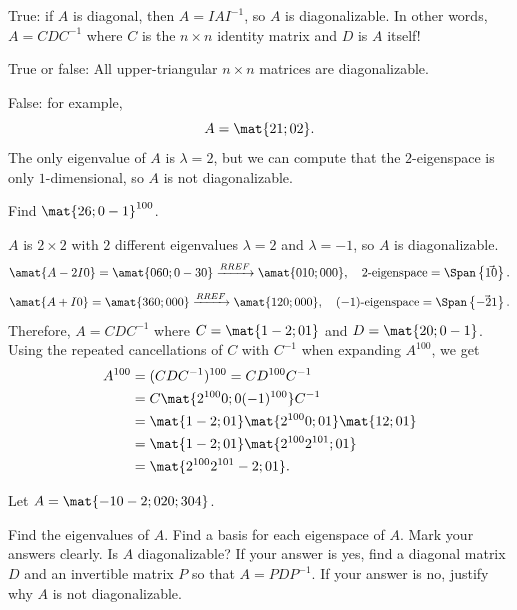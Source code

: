 \begin{problems}
\begin{solution}
  True: if $A$ is diagonal, then $A = I A I^{-1}$, so $A$ is diagonalizable.  In
  other words, $A = CDC^{-1}$ where $C$ is the $n \times n$ identity matrix and
  $D$ is $A$ itself!
\end{solution}

\problem %
True or false: All upper-triangular $n \times n$ matrices are diagonalizable.

\begin{solution}
False: for example,
\[A = \mat{2 1; 0 2}.\] The only eigenvalue of $A$ is $\lambda = 2$, but we can
compute that the $2$-eigenspace is only $1$-dimensional, so $A$ is not
diagonalizable.
\end{solution}



\problem %
Find $\mat{2 6; 0 -1}^{100}$.

\begin{solution}
  $A$ is $2 \times 2$ with $2$ different eigenvalues $\lambda = 2$ and
  $\lambda = -1$, so $A$ is diagonalizable.
  \[\amat{A-2I 0} = \amat{0 6 0; 0 -3 0} \xrightarrow[]{RREF}
    \amat{0 1 0; 0 0 0}, \quad 2\textup{-eigenspace}
    = \Span \left\{\vec{1 0} \right\}.\]
  \[\amat{A+I 0} = \amat{3 6 0; 0 0 0} \xrightarrow[]{RREF}
    \amat{1 2 0; 0 0 0}, \quad (-1)\textup{-eigenspace}
    = \Span \left\{\vec{-2 1} \right\}.\]
  Therefore, $A = CDC^{-1}$ where $C = \mat{1 -2; 0 1}$ and
  $D = \mat{2 0; 0 -1}$.  Using the repeated cancellations of $C$ with
  $C^{-1}$ when expanding $A^{100}$, we get 
  \begin{align*}
    A^{100} & = (C D C^{-1})^{100} = C D^{100} C^{-1} \\
            & = C \mat{2^{100} 0; 0 (-1)^{100}} C^{-1} \\
            & = \mat{1 -2; 0 1} \mat{2^{100} 0; 0 1} \mat{1 2; 0 1} \\
            & = \mat{1 -2; 0 1} \mat{2^{100} 2^{101}; 0 1} \\
            & = \mat{2^{100} 2^{101}-2; 0 1}.
  \end{align*}

\end{solution}

\problem %
Let $A = \mat{-1 0 -2; 0 2 0; 3 0 4}$.
\begin{subproblems}
  \subproblem Find the eigenvalues of $A$. %
  \subproblem Find a basis for each eigenspace of $A$.  Mark your
  answers clearly.
  \subproblem \enspace Is $A$ diagonalizable?  If your answer is yes,
  find a diagonal matrix $D$ and an invertible matrix $P$ so that
  $A = PDP^{-1}$.  If your answer is no, justify why $A$ is not
  diagonalizable.
\end{subproblems}


\end{problems}
